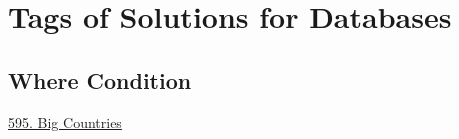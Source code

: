\tocless\section{Tags of Solutions for Databases}
\label{sec:db_tag}

\subsection*{Where Condition}
\begin{flushleft}
\hyperref[db:595]{595. Big Countries}
\end{flushleft}

